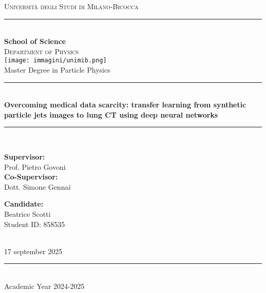 \documentclass[a4paper,12pt]{report}
\begin{document}
\begin{titlepage}
\newcommand{\HRule}{\rule{\linewidth}{0.5mm}} %
\center %
\textsc{\LARGE Università degli Studi di Milano-Bicocca}\\[10pt]
\HRule \\[15pt]
{\bf \large \sc School of Science} \\[10pt]
\textsc{\Large Department of Physics}\\[15pt] %
\texttt{[image: immagini/unimib.png]}\\[20pt]
{\Large Master Degree in Particle Physics}\\[30pt]
\rule{\linewidth}{0.5mm}\\[15pt]
{\huge \bf Overcoming medical data scarcity: transfer learning from synthetic particle jets images to lung CT using deep neural networks}\\[10pt]
\rule{\linewidth}{0.5mm}\\[20pt]
\begin{minipage}[t]{10cm}
        {\Large{\bf Supervisor:}\\[5pt] Prof. Pietro Govoni}\\
        {\Large{\bf Co-Supervisor:}\\[5pt] Dott. Simone Gennai}
\end{minipage}\hfill\begin{minipage}[t]{5cm}\raggedleft
        {\Large{\bf Candidate:}\\[3pt] Beatrice Scotti\\Student ID: 858535 }
\end{minipage} \\[10pt]
\large 17 september 2025
\HRule \\[5pt]
\LARGE Academic Year 2024-2025
\vfill %

\end{titlepage}

\tableofcontents
\newpage 










\end{document}
